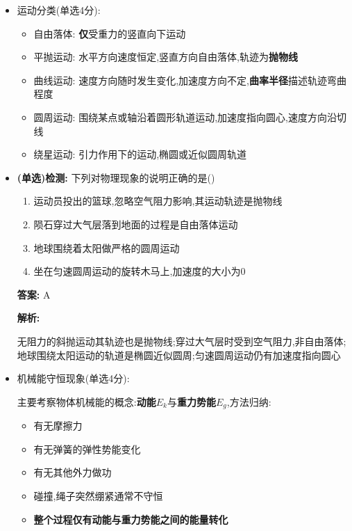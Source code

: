 \documentclass{article}
\begin{document}
\begin{itemize}
        \newpage

        \item 运动分类(单选4分):
        \begin{itemize}
            \item 自由落体: \textbf{仅}受重力的竖直向下运动
            \item 平抛运动: 水平方向速度恒定,竖直方向自由落体,轨迹为\textbf{抛物线}
            \item 曲线运动: 速度方向随时发生变化,加速度方向不定,\textbf{曲率半径}描述轨迹弯曲程度
            \item 圆周运动: 围绕某点或轴沿着圆形轨道运动,加速度指向圆心,速度方向沿切线
            \item 绕星运动: 引力作用下的运动,椭圆或近似圆周轨道
        \end{itemize}

        \vspace{1em}

        \item[] \textbf{(单选)检测:} 下列对物理现象的说明正确的是(\qquad)
        
        \begin{enumerate}[label=\Alph*.]
            \item 运动员投出的篮球,忽略空气阻力影响,其运动轨迹是抛物线
            \item 陨石穿过大气层落到地面的过程是自由落体运动
            \item 地球围绕着太阳做严格的圆周运动
            \item 坐在匀速圆周运动的旋转木马上,加速度的大小为0
        \end{enumerate}

        \textbf{答案:} A

        \textbf{解析:} 
        
        \hspace{2em}无阻力的斜抛运动其轨迹也是抛物线;穿过大气层时受到空气阻力,非自由落体;
        地球围绕太阳运动的轨道是椭圆近似圆周;匀速圆周运动仍有加速度指向圆心

        \vspace{2em}
        
        \item 机械能守恒现象(单选4分):
        
        \hspace{2em}主要考察物体机械能的概念:\textbf{动能$E_{k}$}与\textbf{重力势能$E_{g}$},方法归纳:
        \begin{itemize}
            \item 有无摩擦力
            \item 有无弹簧的弹性势能变化
            \item 有无其他外力做功
            \item 碰撞,绳子突然绷紧通常不守恒
            \item \textbf{整个过程仅有动能与重力势能之间的能量转化}
        \end{itemize}


\end{itemize}
\end{document}
